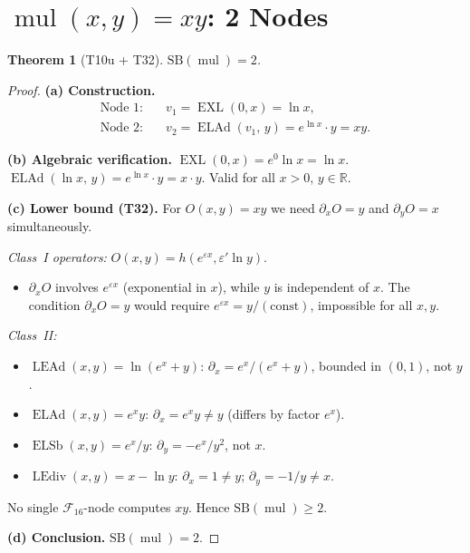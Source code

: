 \documentclass[12pt,a4paper]{article}
\newtheorem{theorem}{Theorem}[section]
\theoremstyle{definition}
\newcommand{\EXL}{\operatorname{EXL}}
\newcommand{\ELAd}{\operatorname{ELAd}}
\newcommand{\ELSb}{\operatorname{ELSb}}
\newcommand{\LEAd}{\operatorname{LEAd}}
\newcommand{\LEdiv}{\operatorname{LEdiv}}
\newcommand{\mulop}{\operatorname{mul}}
\newcommand{\SB}{\mathrm{SB}}
\newcommand{\F}{\mathcal{F}_{16}}
\begin{document}
\section{\texorpdfstring{$\mulop(x,y) = xy$}{mul(x,y)}: 2 Nodes}
\label{sec:mul}

\begin{theorem}[T10u + T32]
\label{thm:mul}
$\SB(\mulop) = 2$.
\end{theorem}

\begin{proof}
\textbf{(a) Construction.}
\begin{align*}
  \text{Node 1:} &\quad v_1 = \EXL(0,x) = \ln x, \\
  \text{Node 2:} &\quad v_2 = \ELAd(v_1,\,y) = e^{\ln x} \cdot y = xy.
\end{align*}

\textbf{(b) Algebraic verification.}
$\EXL(0,x) = e^0 \ln x = \ln x$.
$\ELAd(\ln x,\,y) = e^{\ln x} \cdot y = x \cdot y$.
Valid for all $x>0$, $y\in\mathbb{R}$.

\textbf{(c) Lower bound (T32).}
For $O(x,y) = xy$ we need $\partial_x O = y$ and $\partial_y O = x$ simultaneously.

\emph{Class~I operators:} $O(x,y) = h(e^{\varepsilon x}, \varepsilon'\ln y)$.
\begin{itemize}
  \item $\partial_x O$ involves $e^{\varepsilon x}$ (exponential in $x$),
    while $y$ is independent of $x$.  The condition $\partial_x O = y$
    would require $e^{\varepsilon x} = y/(\text{const})$, impossible for all $x,y$.
\end{itemize}

\emph{Class~II:}
\begin{itemize}
  \item $\LEAd(x,y) = \ln(e^x+y)$:\;
    $\partial_x = e^x/(e^x+y)$, bounded in $(0,1)$, not $y$.
  \item $\ELAd(x,y) = e^x y$:\;
    $\partial_x = e^x y \ne y$ (differs by factor $e^x$).
  \item $\ELSb(x,y) = e^x/y$:\;
    $\partial_y = -e^x/y^2$, not $x$.
  \item $\LEdiv(x,y) = x - \ln y$:\;
    $\partial_x = 1 \ne y$; $\partial_y = -1/y \ne x$.
\end{itemize}
No single $\F$-node computes $xy$.  Hence $\SB(\mulop) \ge 2$.

\textbf{(d) Conclusion.} $\SB(\mulop) = 2$.
\end{proof}
\end{document}
